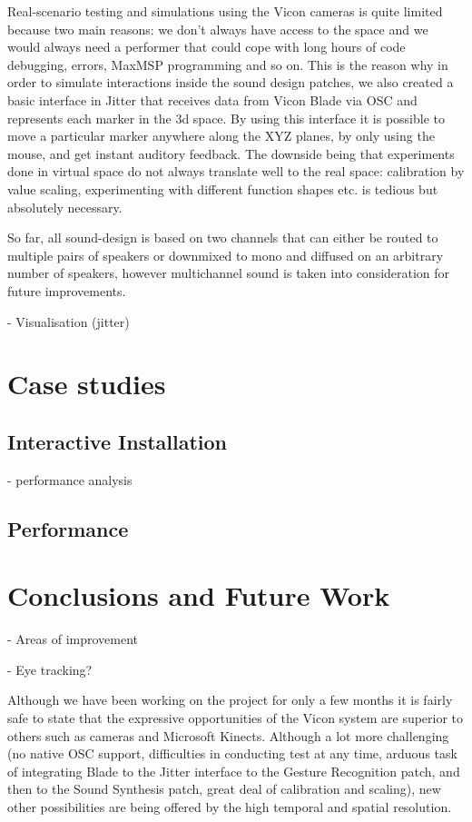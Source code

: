 \documentclass{nime-alternate}
\begin{document}
Real-scenario testing and simulations using the Vicon cameras is quite limited because two main reasons: we don’t always have access to the space and we would always need a performer that could cope with long hours of code debugging, errors, MaxMSP programming and so on. This is the reason why in order to simulate interactions inside the sound design patches, we also created a basic interface in Jitter that receives data from Vicon Blade via OSC and represents each marker in the 3d space. By using this interface it is possible to move a particular marker anywhere along the XYZ planes, by only using the mouse, and get instant auditory feedback. The downside being that experiments done in virtual space do not always translate well to the real space: calibration by value scaling, experimenting with different function shapes etc. is tedious but absolutely necessary.

So far, all sound-design is based on two channels that can either be routed to multiple pairs of speakers or downmixed to mono and diffused on an arbitrary number of speakers, however multichannel sound is taken into consideration for future improvements.


- Visualisation (jitter)

\section{Case studies}



\subsection{Interactive Installation}

- performance analysis

\subsection{Performance}



\section{Conclusions and Future Work}
- Areas of improvement

- Eye tracking?

Although we have been working on the project for only a few months it is fairly safe to state that the expressive opportunities of the Vicon system are superior to others such as cameras and Microsoft Kinects. Although a lot more challenging (no native OSC support, difficulties in conducting test at any time, arduous task of integrating Blade to the Jitter interface to the Gesture Recognition patch, and then to the Sound Synthesis patch, great deal of calibration and scaling), new other possibilities are being offered by the high temporal and spatial resolution.
\end{document}
